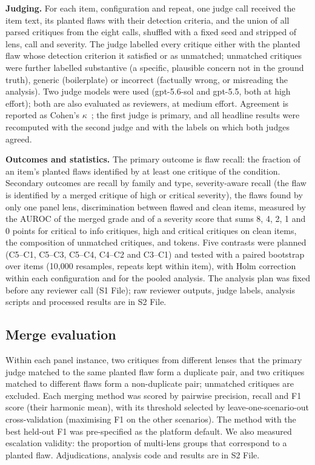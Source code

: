 \textbf{Judging.} For each item, configuration and repeat, one judge call received the item text, its planted flaws with their detection criteria, and the union of all parsed critiques from the eight calls, shuffled with a fixed seed and stripped of lens, call and severity. The judge labelled every critique either with the planted flaw whose detection criterion it satisfied or as unmatched; unmatched critiques were further labelled substantive (a specific, plausible concern not in the ground truth), generic (boilerplate) or incorrect (factually wrong, or misreading the analysis). Two judge models were used (gpt-5.6-sol and gpt-5.5, both at high effort); both are also evaluated as reviewers, at medium effort. Agreement is reported as Cohen's $\kappa$~\cite{cohen1960kappa}; the first judge is primary, and all headline results were recomputed with the second judge and with the labels on which both judges agreed.

\textbf{Outcomes and statistics.} The primary outcome is flaw recall: the fraction of an item's planted flaws identified by at least one critique of the condition. Secondary outcomes are recall by family and type, severity-aware recall (the flaw is identified by a merged critique of high or critical severity), the flaws found by only one panel lens, discrimination between flawed and clean items, measured by the AUROC of the merged grade and of a severity score that sums 8, 4, 2, 1 and 0 points for critical to info critiques, high and critical critiques on clean items, the composition of unmatched critiques, and tokens. Five contrasts were planned (C5--C1, C5--C3, C5--C4, C4--C2 and C3--C1) and tested with a paired bootstrap over items (10,000 resamples, repeats kept within item), with Holm correction~\cite{holm1979simple} within each configuration and for the pooled analysis. The analysis plan was fixed before any reviewer call (S1 File); raw reviewer outputs, judge labels, analysis scripts and processed results are in S2 File.

\subsection*{Merge evaluation}

Within each panel instance, two critiques from different lenses that the primary judge matched to the same planted flaw form a duplicate pair, and two critiques matched to different flaws form a non-duplicate pair; unmatched critiques are excluded. Each merging method was scored by pairwise precision, recall and F1 score (their harmonic mean), with its threshold selected by leave-one-scenario-out cross-validation (maximising F1 on the other scenarios). The method with the best held-out F1 was pre-specified as the platform default. We also measured escalation validity: the proportion of multi-lens groups that correspond to a planted flaw. Adjudications, analysis code and results are in S2 File.

